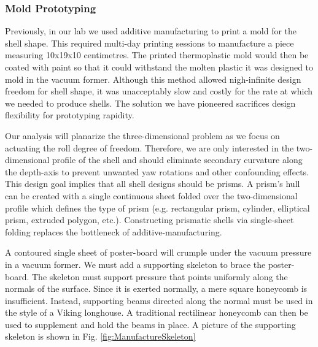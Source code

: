 \documentclass[letterpaper, 10 pt, conference]{ieeeconf}
\begin{document}
\subsubsection{Mold Prototyping}
\label{sec:Molds}
Previously, in our lab we used additive manufacturing to print a mold for the shell shape.
This required multi-day printing sessions to manufacture a piece measuring 10x19x10 centimetres.
The printed thermoplastic mold would then be coated with paint so that it could withstand the molten plastic it was designed to mold in the vacuum former.
Although this method allowed nigh-infinite design freedom for shell shape, it was unacceptably slow and costly for the rate at which we needed to produce shells.
The solution we have pioneered sacrifices design flexibility for prototyping rapidity.

Our analysis will planarize the three-dimensional problem as we focus on actuating the roll degree of freedom.
Therefore, we are only interested in the two-dimensional profile of the shell and should eliminate secondary curvature along the depth-axis to prevent unwanted yaw rotations and other confounding effects.
This design goal implies that all shell designs should be prisms.
A prism's hull can be created with a single continuous sheet folded over the two-dimensional profile which defines the type of prism (e.g. rectangular prism, cylinder, elliptical prism, extruded polygon, etc.).
Constructing prismatic shells via single-sheet folding replaces the bottleneck of additive-manufacturing.

A contoured single sheet of poster-board will crumple under the vacuum pressure in a vacuum former.
We must add a supporting skeleton to brace the poster-board.
The skeleton must support pressure that points uniformly along the normals of the surface.
Since it is exerted normally, a mere square honeycomb is insufficient.
Instead, supporting beams directed along the normal must be used in the style of a Viking longhouse.
A traditional rectilinear honeycomb can then be used to supplement and hold the beams in place.
A picture of the supporting skeleton is shown in Fig. \ref{fig:ManufactureSkeleton}
\end{document}

